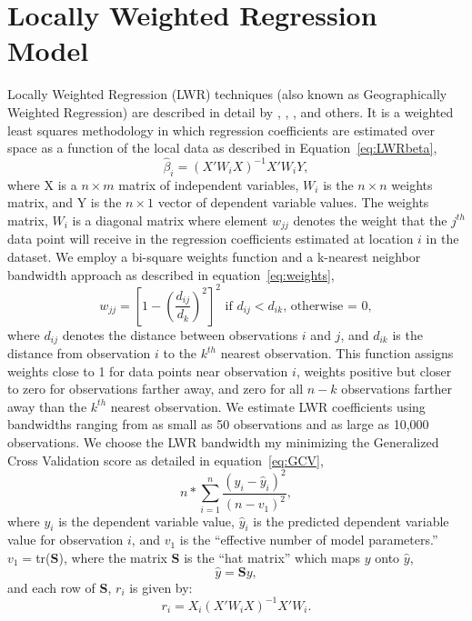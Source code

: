 \documentclass{article}\usepackage{graphicx, color}
\begin{document}
\section{Locally Weighted Regression Model}
Locally Weighted Regression (LWR) techniques (also known as Geographically Weighted Regression) are described in detail by \citet{Cleveland1988}, \citet{Brunsdon1998b}, \citet{Fotheringham2002}, and others. It is a weighted least squares methodology in which regression coefficients are estimated over space as a function of the local data as described in Equation~\eqref{eq:LWRbeta},
\begin{equation}\label{eq:LWRbeta}
\hat{\beta}_i = (X'W_iX)^{-1}X'W_iY,
\end{equation}
where X is a $n \times m$ matrix of independent variables, $W_i$ is the $n \times n$ weights matrix, and Y is the $n \times 1$ vector of dependent variable values. The weights matrix, $W_i$ is a diagonal matrix where element $w_{jj}$ denotes the weight that the $j^{th}$ data point will receive in the regression coefficients estimated at location $i$ in the dataset. We employ a bi-square weights function and a k-nearest neighbor bandwidth approach as described in equation~\eqref{eq:weights}, 
\begin{equation}\label{eq:weights}
w_{jj}=\left[1-\left(\frac{d_{ij}}{d_{k}}\right)^2 \right]^2 \textrm{ if  }d_{ij}<d_{ik}\textrm{, otherwise = 0},
\end{equation}
where $d_{ij}$ denotes the distance between observations $i$ and $j$, and $d_{ik}$ is the distance from observation $i$ to the $k^{th}$ nearest observation. This function assigns weights close to 1 for data points near observation $i$, weights positive but closer to zero for observations farther away, and zero for all $n-k$ observations farther away than the $k^{th}$ nearest observation. 
We estimate LWR coefficients using bandwidths ranging from as small as 50 observations and as large as 10,000 observations. We choose the LWR bandwidth my minimizing the Generalized Cross Validation score as detailed in equation~\eqref{eq:GCV},
\begin{equation}\label{eq:GCV}
n*\sum_{i=1}^{n}\frac{(y_i-\hat{y}_i)^2}{(n-v_1)^2}, 
\end{equation} 
where $y_i$ is the dependent variable value, $\hat{y}_i$ is the predicted dependent variable value for observation $i$, and $v_1$ is the ``effective number of model parameters.''
$v_1=$tr(\textbf{S}), where the matrix \textbf{S} is the ``hat matrix'' which maps $y$ onto $\hat{y}$,
                   \begin{equation*}
                   \hat{y}=\textbf{S}y,
                   \end{equation*}
                   and each row of \textbf{S}, $r_i$ is given by:
                     \begin{equation*}
                   r_i=X_i(X'W_iX)^{-1}X'W_i.
                   \end{equation*}                
\end{document}
